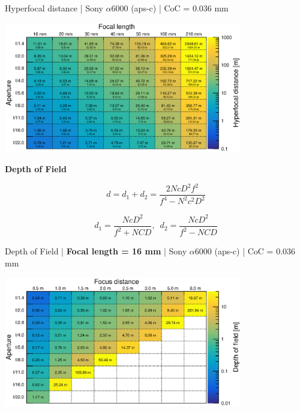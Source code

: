 \documentclass[aspectratio=169]{beamer}
\begin{document}
\begin{frame}[plain]{}
  \vspace{1ex}
  \centering
  Hyperfocal distance | Sony $\alpha$\hspace{0.1em}6000 (aps-c) | CoC = 0.036 mm
  
  \includegraphics[center,width=0.78\textwidth]{img/hyperfocal-distance.eps}
\end{frame}


\begin{frame}[plain]{}
  \vspace{3ex}
  \begin{center} \LARGE \bf
    Depth of Field
  \end{center}

  {\Large 
    $$\mathit{d = d_1 + d_2 = \frac{2NcD^2f^2}{f^4 - N^2c^2D^2}}$$
  }

  \vspace{2ex}
  {\scriptsize
    $$\mathit{d_1 = \frac{NcD^2}{f^2 + NCD}}, \, \, \, \mathit{d_2 = \frac{NcD^2}{f^2 - NCD}}$$
  }

\end{frame}

\begin{frame}[plain]{}
  \vspace{1ex}
  \centering
  Depth of Field | {\bf Focal length = 16 mm} |  Sony $\alpha$\hspace{0.1em}6000 (aps-c) | CoC = 0.036 mm
  
  \includegraphics[center,width=0.78\textwidth]{img/depth-of-field_focl16.eps}
\end{frame}
\end{document}
